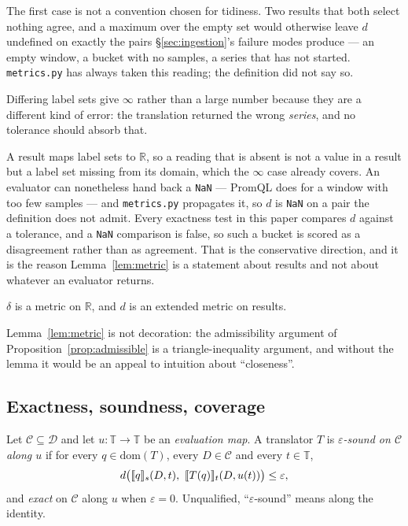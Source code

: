 \noindent
The first case is not a convention chosen for tidiness. Two results that both select
nothing agree, and a maximum over the empty set would otherwise leave $d$ undefined on
exactly the pairs \S\ref{sec:ingestion}'s failure modes produce --- an empty window, a
bucket with no samples, a series that has not started. \texttt{metrics.py} has always
taken this reading; the definition did not say so.

\noindent
Differing label sets give $\infty$ rather than a large number because they are a
different kind of error: the translation returned the wrong \emph{series}, and no
tolerance should absorb that.

\noindent
A result maps label sets to $\mathbb{R}$, so a reading that is absent is not a value in
a result but a label set missing from its domain, which the $\infty$ case already
covers. An evaluator can nonetheless hand back a \texttt{NaN} --- PromQL does for a
window with too few samples --- and \texttt{metrics.py} propagates it, so $d$ is
\texttt{NaN} on a pair the definition does not admit. Every exactness test in this paper
compares $d$ against a tolerance, and a \texttt{NaN} comparison is false, so such a
bucket is scored as a disagreement rather than as agreement. That is the conservative
direction, and it is the reason Lemma~\ref{lem:metric} is a statement about results and
not about whatever an evaluator returns.

\begin{lemma}[$d$ is a metric]\label{lem:metric}
$\delta$ is a metric on $\mathbb{R}$, and $d$ is an extended metric on results.
\end{lemma}
\iffull\fi

\noindent
Lemma~\ref{lem:metric} is not decoration: the admissibility argument of
Proposition~\ref{prop:admissible} is a triangle-inequality argument, and without the
lemma it would be an appeal to intuition about ``closeness''.

\subsection{Exactness, soundness, coverage}

\begin{definition}\label{def:sound}
Let $\mathcal{C}\subseteq\mathcal{D}$ and let $u:\mathbb{T}\to\mathbb{T}$ be an
\emph{evaluation map}. A translator $T$ is \emph{$\varepsilon$-sound on $\mathcal{C}$
along $u$} if for every $q\in\mathrm{dom}(T)$, every $D\in\mathcal{C}$ and every
$t\in\mathbb{T}$,
\[
d\big(\sem{q}_s(D,t),\ \sem{T(q)}_t(D,u(t))\big)\le\varepsilon,
\]
and \emph{exact} on $\mathcal{C}$ along $u$ when $\varepsilon=0$. Unqualified,
``$\varepsilon$-sound'' means along the identity.
\end{definition}

